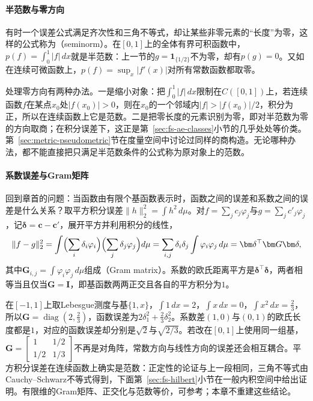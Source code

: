 \paragraph{半范数与零方向}
有时一个误差公式满足齐次性和三角不等式，却让某些非零元素的“长度”为零，这样的公式称为（seminorm）。在$[0,1]$上的全体有界可积函数中，$p(f)=\int_0^1|f|\,dx$就是半范数：上一节的$g=\mathbf 1_{\{1/2\}}$不为零，却有$p(g)=0$。又如在连续可微函数上，$p(f)=\sup_x|f'(x)|$对所有常数函数都取零。

处理零方向有两种办法。一是缩小对象：把$\int_0^1|f|\,dx$限制在$C([0,1])$上，若连续函数$f$在某点$x_0$处$|f(x_0)|>0$，则在$x_0$的一个邻域内$|f|>|f(x_0)|/2$，积分为正，所以在连续函数上它是范数。二是把零长度的元素识别为零，即对半范数为零的方向取商；在积分误差下，这正是第~\ref{sec:fs-ae-classes}小节的几乎处处等价类。第~\ref{sec:metric-pseudometric}节在度量空间中讨论过同样的商构造。无论哪种办法，都不能直接把只满足半范数条件的公式称为原对象上的范数。

\paragraph{系数误差与Gram矩阵}
回到章首的问题：当函数由有限个基函数表示时，函数之间的误差和系数之间的误差是什么关系？取平方积分误差$\|h\|_2^2=\int h^2\,d\mu$。对$f=\sum_jc_j\varphi_j$与$g=\sum_jc'_j\varphi_j$，记$\bm\delta=\bm c-\bm c'$，展开平方并利用积分的线性，
\[
 \|f-g\|_2^2=\int\Bigl(\sum_{i}\delta_i\varphi_i\Bigr)\Bigl(\sum_j\delta_j\varphi_j\Bigr)d\mu
 =\sum_{i,j}\delta_i\delta_j\int\varphi_i\varphi_j\,d\mu
 =\bm\delta^{\top}\bm G\bm\delta,
\]
其中$\bm G_{i,j}=\int\varphi_i\varphi_j\,d\mu$组成（Gram matrix）。系数的欧氏距离平方是$\bm\delta^{\top}\bm\delta$，两者相等当且仅当$\bm G=\bm I$，即基函数两两正交且各自的平方积分为$1$。

在$[-1,1]$上取Lebesgue测度与基$\{1,x\}$，$\int1\,dx=2$，$\int x\,dx=0$，$\int x^2\,dx=\tfrac23$，所以$\bm G=\operatorname{diag}(2,\tfrac23)$，函数误差为$2\delta_1^2+\tfrac23\delta_2^2$。系数差$(1,0)$与$(0,1)$的欧氏长度都是$1$，对应的函数误差却分别是$\sqrt2$与$\sqrt{2/3}$。若改在$[0,1]$上使用同一组基，$\bm G=\begin{bmatrix}1&1/2\\1/2&1/3\end{bmatrix}$不再是对角阵，常数方向与线性方向的误差还会相互耦合。平方积分误差在连续函数上确实是范数：正定性的论证与上一段相同，三角不等式由Cauchy--Schwarz不等式得到，下面第~\ref{sec:fs-hilbert}小节在一般内积空间中给出证明。有限维的Gram矩阵、正交化与范数等价，可参考；本章不重建这些结论。

